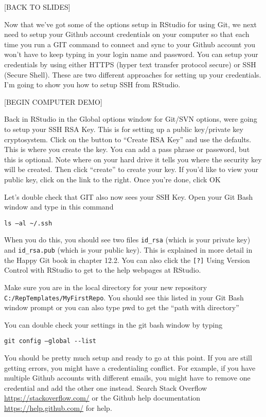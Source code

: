 \documentclass[
]{book}
\begin{document}
{[}BACK TO SLIDES{]}

Now that we've got some of the options setup in RStudio for using Git, we next need to setup your Github account credentials on your computer so that each time you run a GIT command to connect and sync to your Github account you won't have to keep typing in your login name and password. You can setup your credentials by using either HTTPS (hyper text transfer protocol secure) or SSH (Secure Shell). These are two different approaches for setting up your credentials. I'm going to show you how to setup SSH from RStudio.

{[}BEGIN COMPUTER DEMO{]}

Back in RStudio in the Global options window for Git/SVN options, were going to setup your SSH RSA Key. This is for setting up a public key/private key cryptosystem. Click on the button to ``Create RSA Key'' and use the defaults. This is where you create the key. You can add a pass phrase or password, but this is optional. Note where on your hard drive it tells you where the security key will be created. Then click ``create'' to create your key. If you'd like to view your public key, click on the link to the right. Once you're done, click OK

Let's double check that GIT also now sees your SSH Key. Open your Git Bash window and type in this command

\texttt{ls\ –al\ \textasciitilde{}/.ssh}

When you do this, you should see two files \texttt{id\_rsa} (which is your private key) and \texttt{id\_rsa.pub} (which is your public key). This is explained in more detail in the Happy Git book in chapter 12.2. You can also click the \texttt{{[}?{]}} Using Version Control with RStudio to get to the help webpages at RStudio.

Make sure you are in the local directory for your new repository \texttt{C:/RepTemplates/MyFirstRepo}. You should see this listed in your Git Bash window prompt or you can also type pwd to get the ``path with directory''

You can double check your settings in the git bash window by typing

\texttt{git\ config\ –global\ -\/-list}

You should be pretty much setup and ready to go at this point. If you are still getting errors, you might have a credentialing conflict. For example, if you have multiple Github accounts with different emails, you might have to remove one credential and add the other one instead. Search Stack Overflow \url{https://stackoverflow.com/} or the Github help documentation \url{https://help.github.com/} for help.
\end{document}
